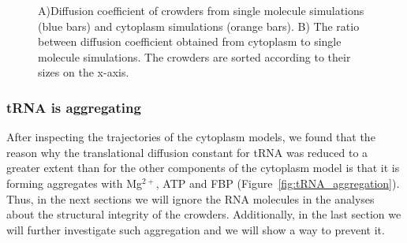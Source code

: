 \documentclass[journal=jacsat,manuscript=article]{achemso}
\begin{document}
\begin{figure}[H]
\caption{A)Diffusion coefficient of crowders from single molecule simulations (blue bars) and cytoplasm simulations (orange bars). B) The ratio between diffusion coefficient obtained from cytoplasm to single molecule simulations. The crowders are sorted according to their sizes on the x-axis. \textbf{\color{red}{THE Dcyto/Ddil PLOT IS "SQUEEZED" BECAUSE OF ITS STRANGE SCALE. IT WOULD BE BETTER TO CENTER THE DATAPOITS, E.G. USE THE Y-AXIS RANGE OF 0.0-0.2 OR SOMETHING SIMILAR. THIS SCALE WILL MAKE THE DIFFERENCE OF THE BEHAVIOR OF tRNA MORE VISIBLE AS WELL}}}
\label{fig:translational_diffusion}
\end{figure}











\subsubsection{tRNA is aggregating}
After inspecting the trajectories of the cytoplasm models, we found that the reason why the translational diffusion constant for tRNA was reduced to a greater extent than for the other components of the cytoplasm model is that it is forming aggregates with Mg$^{2+}$, ATP and FBP (Figure~\ref{fig:tRNA_aggregation}). Thus, in the next sections we will ignore the RNA molecules in the analyses about the structural integrity of the crowders. Additionally, in the last section we will further investigate such aggregation and we will show a way to prevent it.
\end{document}
